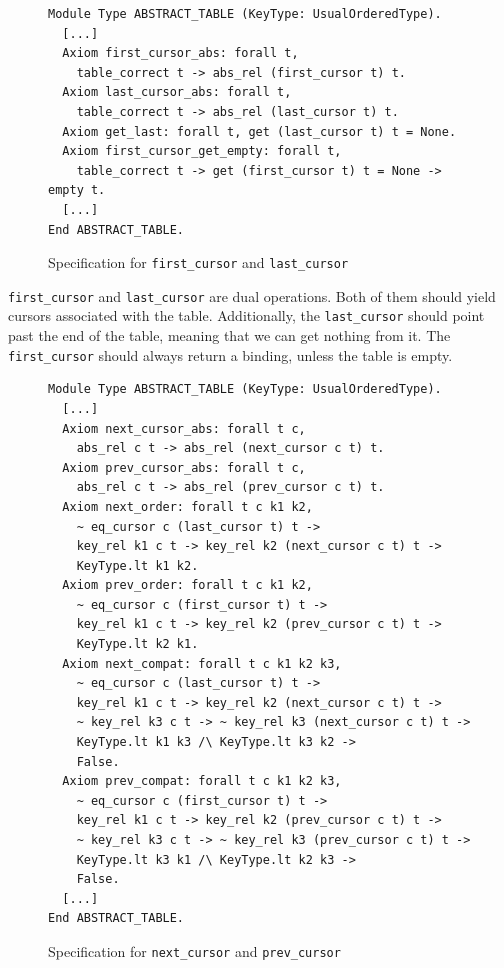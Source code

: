 \documentclass[runningheads]{llncs}
\begin{document}
\begin{figure}[htbp]
  \centering
  \begin{verbatim}
Module Type ABSTRACT_TABLE (KeyType: UsualOrderedType).
  [...]
  Axiom first_cursor_abs: forall t,
    table_correct t -> abs_rel (first_cursor t) t.
  Axiom last_cursor_abs: forall t,
    table_correct t -> abs_rel (last_cursor t) t.
  Axiom get_last: forall t, get (last_cursor t) t = None.
  Axiom first_cursor_get_empty: forall t,
    table_correct t -> get (first_cursor t) t = None -> empty t.
  [...]
End ABSTRACT_TABLE.
\end{verbatim}
  \caption{Specification for \texttt{first\_cursor} and \texttt{last\_cursor}}\label{fig:first_last}
\end{figure}

\texttt{first\_cursor} and \texttt{last\_cursor} are dual operations. Both of
them should yield cursors associated with the table. Additionally, the
\texttt{last\_cursor} should point past the end of the table, meaning that we
can get nothing from it. The \texttt{first\_cursor} should always return a
binding, unless the table is empty.

\begin{figure}[htbp]
  \centering
  \begin{verbatim}
Module Type ABSTRACT_TABLE (KeyType: UsualOrderedType).
  [...]
  Axiom next_cursor_abs: forall t c,
    abs_rel c t -> abs_rel (next_cursor c t) t.
  Axiom prev_cursor_abs: forall t c,
    abs_rel c t -> abs_rel (prev_cursor c t) t.
  Axiom next_order: forall t c k1 k2,
    ~ eq_cursor c (last_cursor t) t ->
    key_rel k1 c t -> key_rel k2 (next_cursor c t) t ->
    KeyType.lt k1 k2.
  Axiom prev_order: forall t c k1 k2,
    ~ eq_cursor c (first_cursor t) t ->
    key_rel k1 c t -> key_rel k2 (prev_cursor c t) t ->
    KeyType.lt k2 k1.
  Axiom next_compat: forall t c k1 k2 k3,
    ~ eq_cursor c (last_cursor t) t ->
    key_rel k1 c t -> key_rel k2 (next_cursor c t) t ->
    ~ key_rel k3 c t -> ~ key_rel k3 (next_cursor c t) t ->
    KeyType.lt k1 k3 /\ KeyType.lt k3 k2 ->
    False.
  Axiom prev_compat: forall t c k1 k2 k3,
    ~ eq_cursor c (first_cursor t) t ->
    key_rel k1 c t -> key_rel k2 (prev_cursor c t) t ->
    ~ key_rel k3 c t -> ~ key_rel k3 (prev_cursor c t) t ->
    KeyType.lt k3 k1 /\ KeyType.lt k2 k3 ->
    False.
  [...]
End ABSTRACT_TABLE.
\end{verbatim}
  \caption{Specification for \texttt{next\_cursor} and \texttt{prev\_cursor}}\label{fig:next_prev}
\end{figure}
\end{document}
